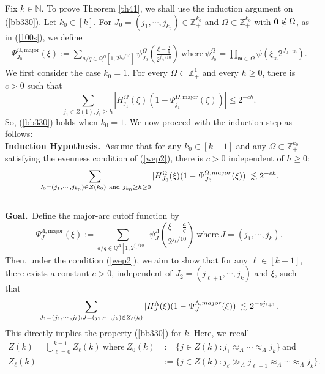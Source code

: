 \documentclass[10pt,a4paper]{amsart}
\numberwithin{equation}{section}
\begin{document}
 

   Fix $k\in \mathbb{N}$. To prove  Theorem \ref{th41},  we shall use the induction argument on (\ref{bb330}).
 Let $ k_0\in  [k]$. For $J_0=(j_1,\cdots,j_{k_0})\in \mathbb{Z}^{k_0}_+$ and $\Omega\subset \mathbb{Z}_+^{k_0}$ with ${\bf 0}\notin \Omega$, as in (\ref{100s}), we  define
\begin{align*}
\Psi^{\Omega,\mathrm{major}}_{J_0}(\xi) :=\sum_{a/q \in \mathbb{Q}^{\Omega}[1, 2^{j_{k_0}/10}]}
\psi^{\Omega}_{J_0} \left( \frac{\xi- \frac{a}{q}}{2^{j_{k_0}/10}} \right)\ \text{where}\   \psi^{\Omega}_{J_0} =\prod_{\mathfrak{m}\in \Omega}\psi\left(\xi_{\mathfrak{m}} 2^{J_0\cdot \mathfrak{m}} \right).
\end{align*}
We first consider the case $k_0=1$. For  every $\Omega\subset \mathbb{Z}_+^1$ and every $h\ge 0$, there is $c>0$ such that
$$ \sum_{j_1\in Z(1); j_1\ge h}| H^{\Omega}_{j_1}(\xi) \left( 1-  \Psi^{\Omega,\mathrm{major}}_{j_1}(\xi)\right)|\le 2^{-ch}. $$ So, (\ref{bb330})  holds when  $k_0=1$.
We now proceed with the induction step as follows:\\
{\bf Induction Hypothesis.}\  Assume  that   for any $ k_0\in  [k-1]$ and any $\Omega\subset \mathbb{Z}_+^{k_0}$  satisfying the evenness condition of (\ref{wep2}),  there is $c>0$ independent of $h\ge 0$:
\begin{align}\label{bb33}
 \sum_{J_0=(j_1,\cdots,j_{k_0})\in  Z(k_0)\ \text{and}\ j_{k_0}\ge h\ge 0}|H^{\Omega}_{J_0}(\xi)(1-\Psi^{\Omega,\rm{major}}_{J_0}(\xi))|\lesssim 2^{-ch}. 
\end{align}
\\
{\bf Goal.}\  Define the major-arc cutoff  function  by
$$  \Psi^{\Lambda,\mathrm{major}}_{J}(\xi) := \sum_{a/q \in \mathbb{Q}^{\Lambda}[1, 2^{j_{k}/10}]}
\psi^{\Lambda}_{J} \left( \frac{\xi- \frac{a}{q}}{2^{j_{k}/10}} \right)\ \text{where}\ J=(j_1,\cdots,j_{k}). $$ Then,
under  the  condition (\ref{wep2}),  we aim to show that for any  $\ell\in [k-1]$, there exists a constant \( c > 0 \), independent of \( J_2=(j_{\ell+1},\cdots,j_k) \) and \( \xi \), such that 
\begin{align}\label{rpkg9}
 \sum_{J_1=(j_1,\cdots,j_\ell):J=(j_1,\cdots,j_k)\in Z_{\ell}(k)}|H^{\Lambda}_J(\xi)(1-\Psi^{\Lambda,\rm{major}}_{J}(\xi))|\lesssim 2^{-cj_{\ell+1}}.
\end{align}
This directly implies the property (\ref{bb330}) for  $k$. Here, we recall   \begin{align*}
	Z(k)=\bigcup_{\ell=0}^{k-1}Z_{\ell}(k) \ \text{where}   \	Z_0(k)&:=\{ j\in Z(k):   j_{1}\approx_{\Lambda}  \cdots\approx_{\Lambda} j_k\}\  \text{and} \\
	Z_{\ell}(k)&:=\{j\in Z(k):   j_\ell\gg_{\Lambda} j_{\ell+1}\approx_{\Lambda}\cdots\approx_{\Lambda} j_k\}. 
\end{align*}
 
\end{document}
